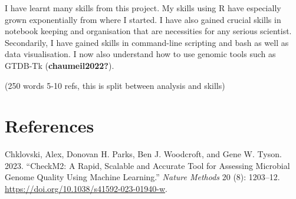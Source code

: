 \documentclass[
  letterpaper,
  DIV=11,
  numbers=noendperiod]{scrreprt}
\newlength{\cslhangindent}
\newenvironment{CSLReferences}[2] %
 {\begin{list}{}{%
  \setlength{\itemindent}{0pt}
  \setlength{\leftmargin}{0pt}
  \setlength{\parsep}{0pt}
  \ifodd #1
   \setlength{\leftmargin}{\cslhangindent}
   \setlength{\itemindent}{-1\cslhangindent}
  \fi
  \setlength{\itemsep}{#2\baselineskip}}}
 {\end{list}}
\begin{document}
I have learnt many skills from this project. My skills using R have
especially grown exponentially from where I started. I have also gained
crucial skills in notebook keeping and organisation that are necessities
for any serious scientist. Secondarily, I have gained skills in
command-line scripting and bash as well as data visualisation. I now
also understand how to use genomic tools such as GTDB-Tk
(\textbf{chaumeil2022?}).

(250 words 5-10 refs, this is split between analysis and skills)


\chapter*{References}\label{references}


\label{refs}
\begin{CSLReferences}{1}{0}
Chklovski, Alex, Donovan H. Parks, Ben J. Woodcroft, and Gene W. Tyson.
2023. {``CheckM2: A Rapid, Scalable and Accurate Tool for Assessing
Microbial Genome Quality Using Machine Learning.''} \emph{Nature
Methods} 20 (8): 1203--12.
\url{https://doi.org/10.1038/s41592-023-01940-w}.

\end{CSLReferences}
\end{document}
